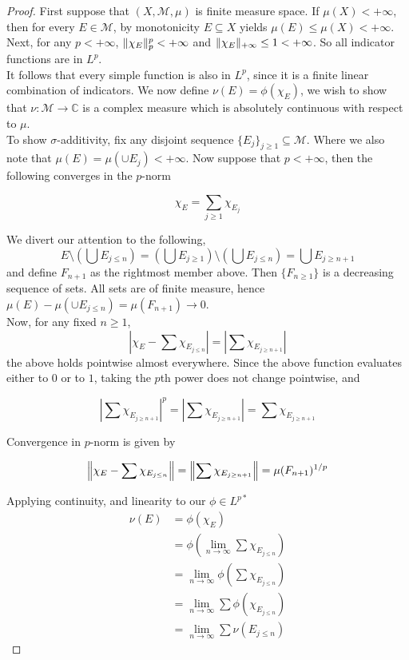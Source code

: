 \documentclass[../../main.tex]{subfiles}
\begin{document}
\begin{wts}
    
\end{wts}
\begin{proof}
First suppose that $(X,\mathcal{M}, \mu)$ is finite measure space. If $\mu(X)<+\infty$, then for every $E\in\mathcal{M}$, by monotonicity $E\subseteq X$ yields $\mu(E)\leq \mu(X)<+\infty$. Next, for any $p<+\infty$, $\lVert {\chi_E} \rVert ^p_p<+\infty$ and $\lVert {\chi_E} \rVert_{+\infty}\leq 1<+\infty$. So all indicator functions are in $L^p$.\\

It follows that every simple function is also in $L^p$, since it is a finite linear combination of indicators. We now define $\nu(E) = \phi(\chi_E)$, we wish to show that $\nu:\mathcal{M}\longrightarrow \mathbb{C}$ is a complex measure which is absolutely continuous with respect to $\mu$.\\

To show $\sigma$-additivity, fix any disjoint sequence $\{E_j\}_{j\geq 1}\subseteq \mathcal{M}$. Where we also note that $\mu(E) = \mu(\cup E_j) <+\infty$. Now suppose that $p<+\infty$, then the following converges in the $p$-norm

\[
\chi_E = \sum_{j\geq 1}\chi_{E_j}
\]

We divert our attention to the following,
\[
E\setminus\left(\bigcup E_{j\leq n}\right) = \left(\bigcup E_{j\geq 1}\right)\setminus \left(\bigcup E_{j\leq n}\right) = \bigcup E_{j\geq n+1}
\]
and define $F_{n+1}$ as the rightmost member above. Then $\{F_{n\geq 1}\}$ is a decreasing sequence of sets. All sets are of finite measure, hence $\mu(E) - \mu(\cup E_{j\leq n}) = \mu(F_{n+1})\to 0$.\\ 

Now, for any fixed $n\geq 1$, 
\[
\left|\chi_E - \sum \chi_{E_{j\leq n}}\right| = \left|\sum \chi_{E_{j\geq n+1}}\right| 
\]
the above holds pointwise almost everywhere. Since the above function evaluates either to $0$ or to $1$, taking the $p$th power does not change pointwise, and 

\[
\left|\sum \chi_{E_{j\geq n+1}}\right|^p = \left|\sum \chi_{E_{j\geq n+1}}\right| = \sum \chi_{E_{j\geq n+1}}
\]

Convergence in $p$-norm is given by

\[
\left\lVert {\chi_E - \sum \chi_{E_{j\leq n}}} \right\rVert = \left\lVert {\sum \chi_{E_{j\geq n+1}}} \right\rVert = \mu(F_{n+1})^{1/p}
\]

Applying continuity, and linearity to our $\phi\in L^{p*}$
\begin{align*}
    \nu(E) &= \phi(\chi_E)\\[2ex]
    &= \phi\left(\lim_{n\to\infty} \sum \chi_{E_{j\leq n}}\right)\\[2ex]
    &= \lim_{n\to\infty} \phi\left(\sum \chi_{E_{j\leq n}}\right)\\[2ex]
    &= \lim_{n\to\infty} \sum \phi\left(\chi_{E_{j\leq n}}\right)\\[2ex]
    &= \lim_{n\to\infty} \sum \nu(E_{j\leq n})
\end{align*}


\end{proof}
\end{document}
